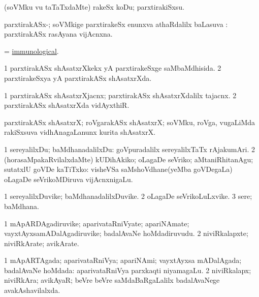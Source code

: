 \bentry
{}
\gl{\sakirx}
\bmng
(soVMku \mo vu taTaTxdaMte) rakeSx koDu; parxtirakiSxsu. 
\emng
\eentry

\bentry
{}
\gl{\sapUpa}
\bmng
parxtirakASx-; soVMkige parxtirakeSx enunxva athaRdalilx baLasuva \sapUpa:  parxtirakASx rasAyana vijAcnxna. 
\emng
\eentry

\bentry
{}
\gl{\gu}
\bmng
 = \hyperlink{immunological}{immunological}. 
\emng
\eentry

\bentry
{}
\gl{\gu}
\bmng
\bnum
\num{1} parxtirakASx shAsatxrXkekx yA parxtirakeSxge saMbaMdhisida. 
\num{2} parxtirakeSxya yA parxtirakASx shAsatxrXda. 
\enum
\emng
\eentry

\bentry
{}
\gl{\nA}
\bmng
\bnum
\num{1} parxtirakASx shAsatxrXjacnx; parxtirakASx shAsatxrXdalilx tajacnx. 
\num{2} parxtirakASx shAsatxrXda vidAyxthiR. 
\enum
\emng
\eentry

\bentry
{}
\gl{\nA}
\bmng
parxtirakASx shAsatxrX; roVgarakASx shAsatxrX; soVMku, roVga, \mo vugaLiMda rakiSxsuva vidhAnagaLanunx kurita shAsatxrX. 
\emng
\eentry

\bentry
{}
\gl{\sakirx}
\bmng
\bnum
\num{1} sereyalilxDu; baMdhanadalilxDu:  goVpuradalilx sereyalilxTaTx rAjakumAri. 
\num{2} (horasaMpakaRvilalxdaMte) kUDihAkiko; oLagaDe seVriko; aMtaniRhitanAgu; sutatxlU goVDe kaTiTxko:  visheVSa saMshoVdhane(yeMba goVDegaLa) oLagaDe seVrikoMDiruva vijAcnxnigaLu. 
\enum
\emng
\eentry

\bentry
{}
\gl{\nA}
\bmng
\bnum
\num{1} sereyalilxDuvike; baMdhanadalilxDuvike. 
\num{2} oLagaDe seVrikoLuLxvike. 
\num{3} sere; baMdhana. 
\enum
\emng
\eentry

\bentry
{}
\gl{\nA}
\bmng
\bnum
\num{1} mApARDAgadiruvike; aparivataRniVyate; apariNAmate; vayxtAyxsamADalAgadiruvike; badalAvaNe hoMdadiruvudu. 
\num{2} niviRkalapxte; niviRkArate; avikArate. 
\enum
\emng
\eentry

\bentry
{}
\gl{\gu}
\bmng
\bnum
\num{1} mApARTAgada; aparivataRniVya; apariNAmi; vayxtAyxsa mADalAgada; badalAvaNe hoMdada:  aparivataRniVya parxkaqti niyamagaLu. 
\num{2} niviRkalapx; niviRkAra; avikAyaR; beVre beVre saMdaBaRgaLalilx badalAvaNege avakAshavilalxda. 
\enum
\emng
\eentry

